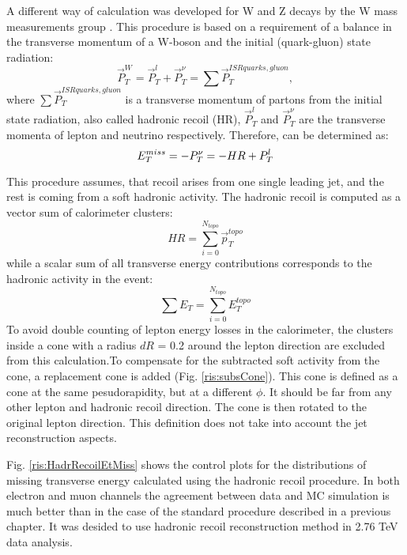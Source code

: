 A different way of \etmiss calculation  was developed for W and Z decays by the W mass measurements group \cite{HadrRecoilFirst}. This procedure is based on a requirement of a balance in the transverse momentum of a W-boson and the initial (quark-gluon) state radiation:
\begin{equation}
\vec{P}_{T}^{W} = \vec{P}_T^l+\vec{P}_T^{\nu}= \sum{\vec{P}_{T}^{ISRquarks,gluon}}, 
\end{equation}
where $\sum{\vec{P}_{T}^{ISRquarks,gluon}}$ is a transverse momentum of partons from the initial state radiation, also called hadronic recoil (HR), $\vec{P}_T^l$ and $\vec{P}_T^{\nu}$ are the transverse momenta of lepton and neutrino respectively. Therefore, \etmiss can be determined as:
\begin{equation}
E_{T}^{miss} = - P_T^{\nu} =  - HR + P_T^l
\end{equation} 

This procedure assumes, that recoil arises from one single leading jet, and the rest  is coming from a soft hadronic activity. The hadronic recoil is computed as a vector sum of calorimeter clusters:
\begin{equation}
HR= \sum_{i=0}^{N_{topo}}\vec{p}_T^{topo}
\end{equation}
while a scalar sum of all transverse energy contributions corresponds to the hadronic activity in the event:
\begin{equation}\label{eq:sumet}
\sum E_T =\sum_{i=0}^{N_{topo}} E_T^{topo}
\end{equation}
To avoid double counting of lepton energy losses in the calorimeter, the clusters inside a cone with a radius $dR$ = 0.2 around the lepton direction are excluded from this calculation.To compensate for the subtracted soft activity from the cone, a replacement cone is added (Fig. \ref{ris:subsCone}). This cone is defined as a cone at the same pesudorapidity, but at a different $\phi$. It should be far from any other lepton and hadronic recoil direction. The cone is then rotated to the original lepton direction. This definition does not take into account the jet reconstruction aspects.   

Fig. \ref{ris:HadrRecoilEtMiss} shows the control plots for the distributions of missing transverse energy calculated using the hadronic recoil procedure. In both electron and muon channels the agreement between data and MC simulation is much better than in the case of the standard procedure described in a previous chapter. It was desided to use hadronic recoil \etmiss reconstruction method in 2.76 TeV data analysis.


